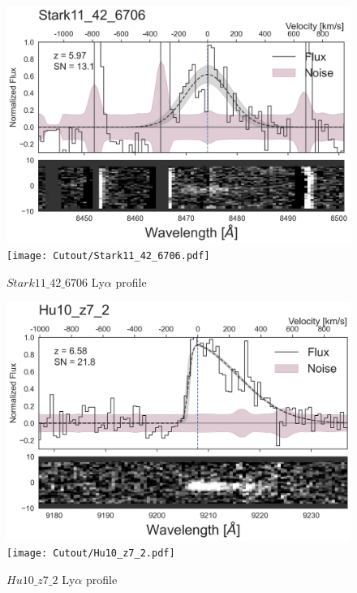 \documentclass[12pt,english]{article}
\begin{document}
\begin{figure}
\begin{center}\includegraphics[width=12cm, trim=0.1cm 0cm 0cm -1cm]{LyaProfiles/Stark11_42_6706.png}
\texttt{[image: Cutout/Stark11\_42\_6706.pdf]}
\caption{$Stark11\_42\_6706$ Ly$\alpha$ profile}
\end{center}
\end{figure}
\clearpage
\begin{figure}
\begin{center}\includegraphics[width=12cm, trim=0.1cm 0cm 0cm -1cm]{LyaProfiles/Hu10_z7_2.png}
\texttt{[image: Cutout/Hu10\_z7\_2.pdf]}
\caption{$Hu10\_z7\_2$ Ly$\alpha$ profile}
\end{center}
\end{figure}
\clearpage
\end{document}
